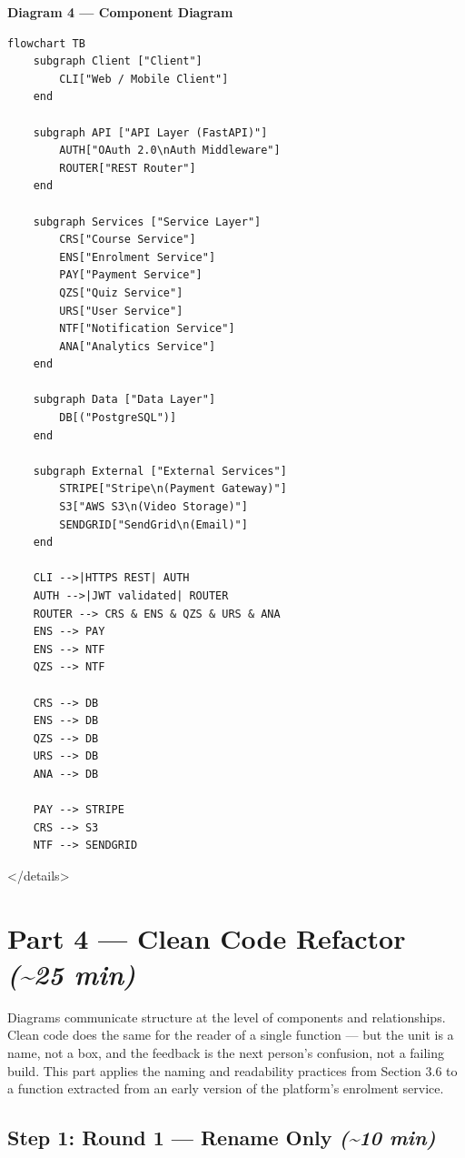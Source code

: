\documentclass[11pt,a4paper]{book}
\begin{document}
\medskip

\textbf{Diagram 4 --- Component Diagram}

\begin{lstlisting}
flowchart TB
    subgraph Client ["Client"]
        CLI["Web / Mobile Client"]
    end

    subgraph API ["API Layer (FastAPI)"]
        AUTH["OAuth 2.0\nAuth Middleware"]
        ROUTER["REST Router"]
    end

    subgraph Services ["Service Layer"]
        CRS["Course Service"]
        ENS["Enrolment Service"]
        PAY["Payment Service"]
        QZS["Quiz Service"]
        URS["User Service"]
        NTF["Notification Service"]
        ANA["Analytics Service"]
    end

    subgraph Data ["Data Layer"]
        DB[("PostgreSQL")]
    end

    subgraph External ["External Services"]
        STRIPE["Stripe\n(Payment Gateway)"]
        S3["AWS S3\n(Video Storage)"]
        SENDGRID["SendGrid\n(Email)"]
    end

    CLI -->|HTTPS REST| AUTH
    AUTH -->|JWT validated| ROUTER
    ROUTER --> CRS & ENS & QZS & URS & ANA
    ENS --> PAY
    ENS --> NTF
    QZS --> NTF

    CRS --> DB
    ENS --> DB
    QZS --> DB
    URS --> DB
    ANA --> DB

    PAY --> STRIPE
    CRS --> S3
    NTF --> SENDGRID
\end{lstlisting}

\medskip

</details>

\medskip

\section{Part 4 --- Clean Code Refactor \textit{(\textasciitilde{}25 min)}}

Diagrams communicate structure at the level of components and relationships. Clean code does the same for the reader of a single function --- but the unit is a name, not a box, and the feedback is the next person's confusion, not a failing build. This part applies the naming and readability practices from Section 3.6 to a function extracted from an early version of the platform's enrolment service.

\subsection{Step 1: Round 1 --- Rename Only \textit{(\textasciitilde{}10 min)}}
\end{document}
